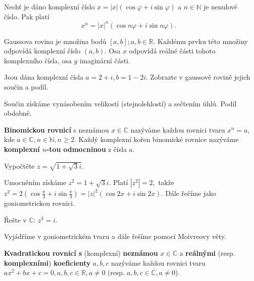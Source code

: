 \begin{veta}
    Nechť je dáno komplexní číslo $x=|x|(\cos \varphi + i \sin \varphi)$ a $n\in \mathbb N$
    je nenulové číslo. Pak platí
    $$x^n = |x|^n (\cos n\varphi + i \sin n \varphi).$$
\end{veta}

\begin{pozn}
    Gaussova rovina je množina bodů $[a,b]; a,b \in \mathbb R$.
    Každému prvku této množiny odpovídá komplexní číslo $(a,b).$ Osa $x$ odpovídá
    reálné části tohoto komplexního čísla, osa $y$ imaginární části.
\end{pozn}

\begin{priklad}
Jsou dána komplexní čísla $a=2+i,b=1-2i$. Zobrazte v gaussově rovině jejich součin a podíl.
\end{priklad}

\begin{reseni}
Součin získáme vynásobením velikostí (stejnolehlostí) a sečtením úhlů. Podíl obdobně.
\end{reseni}

\begin{definition}
\textbf{Binomickou rovnicí} s neznámou $x\in \mathbb C$ nazýváme každou rovnici
tvaru $x^n=a$, kde $a\in \mathbb C,n\in \mathbb N, n\geq 2.$ Každý komplexní
kořen binomické rovnice nazýváme \textbf{komplexní $n$-tou odmocninou} z čísla $a.$
\end{definition}

\begin{priklad}
Vypočtěte $z=\sqrt{1+\sqrt{3}i }. $
\end{priklad}

\begin{reseni}
Umocněním získáme $z^2=1+\sqrt{3}i. $ Platí $|z^2|=2,$ takže $z^2=2(\cos \frac{\pi}{3}+i\sin \frac{\pi}{3})=|z|^2(\cos 2x+i\sin 2x)$.
Dále řečíme jako goniometrickou rovnici.
\end{reseni}

\begin{priklad}
Řešte v $\mathbb C$: $z^3=i.$
\end{priklad}

\begin{reseni}
Vyjádříme v goniometrickém tvaru a dále řešíme pomocí Moivreovy věty.
\end{reseni}

\begin{definition}
\textbf{Kvadratickou rovnicí s} (komplexní) \textbf{neznámou} $x\in \mathbb C$ a
\textbf{reálnými} (resp. \textbf{komplexními}) \textbf{koeficienty} $a,b,c$
nazýváme každou rovnici tvaru
$ax^2+bx+c=0,a,b,c\in \mathbb R,a\ne0$ (resp. $a,b,c \in \mathbb C,a\ne 0$).
\end{definition}

